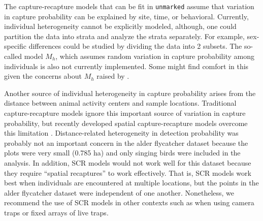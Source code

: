 \documentclass[a4paper]{article}
\begin{document}
The capture-recapture models that can be fit in \texttt{unmarked} assume
that variation in capture probability can be
explained by site, time, or behavioral. Currently, individual
heterogeneity cannot be explicitly modeled, although, one could
partition the data into strata and analyze the strata separately. For
example, sex-specific
differences could be studied by dividing the data into 2 subsets.
The so-called model $M_h$, which assumes
random variation in capture probability among individuals is also not
currently implemented. Some might find comfort in this given the
concerns about $M_h$ raised by \citet{link:2003}.

Another source of individual heterogeneity in capture probability
arises from the distance between animal activity centers and
sample locations. Traditional capture-recapture models ignore this
important source of variation in capture probability, but
recently developed spatial capture-recapture models overcome this
limitation
\citep{efford:2004,royle_young:2008,royle_dorazio:2008}. Distance-related
heterogeneity in detection
probability was probably not an important concern in the alder
flycatcher dataset because the plots were very small (0.785 ha) and
only singing birds were included in the analysis. In addition, SCR
models would not work well for this dataset because they
require ``spatial recaptures'' to work effectively. That is,
SCR models work best when individuals are encountered at multiple
locations, but the points in the alder flycatcher dataset were
independent of one another. Nonetheless, we recommend the use of SCR
models in other contexts such as when using camera traps or fixed
arrays of live traps.


\end{document}
